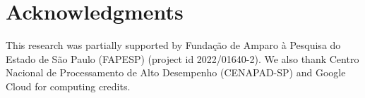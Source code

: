 \documentclass{article}
\begin{document}
\section*{Acknowledgments}

This research was partially supported by Fundação de Amparo à Pesquisa do Estado de São Paulo (FAPESP) (project id 2022/01640-2). We also thank Centro Nacional de Processamento de Alto Desempenho (CENAPAD-SP) and Google Cloud for computing credits.  





\onecolumn

\end{document}
